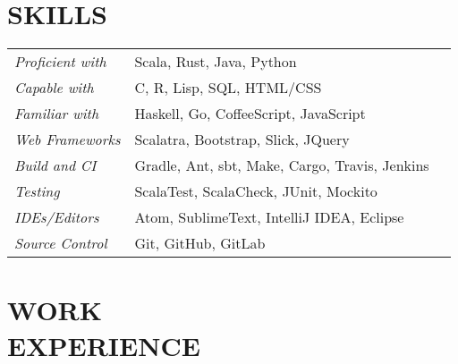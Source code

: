 \documentclass[margin]{res}
\begin{document}
\begin{resume}
\section{SKILLS}
   \begin{tabular}{l p{3in} p}
                \textit{Proficient with} & Scala, Rust, Java, Python \\
                \textit{Capable with} & C, R, Lisp, SQL, HTML/CSS \\
                \textit{Familiar with} & Haskell, Go, CoffeeScript, JavaScript \\
                \textit{Web Frameworks}  & Scalatra, Bootstrap, Slick, JQuery \\
                \textit{Build and CI}  & Gradle, Ant, sbt, Make, Cargo, Travis, Jenkins \\
                \textit{Testing}  & ScalaTest, ScalaCheck, JUnit, Mockito\\
                \textit{IDEs/Editors}  &Atom, SublimeText, IntelliJ IDEA, Eclipse \\
                \textit{Source Control} &Git, GitHub, GitLab
 \end{tabular}


\section{WORK \\ EXPERIENCE}



\end{resume}
\end{document}
